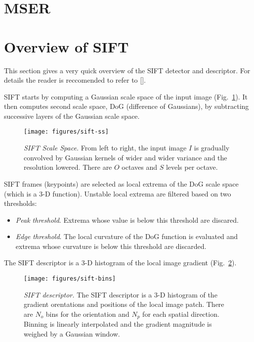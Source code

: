 \documentclass{article}
\begin{document}
\section{MSER}\label{mser}


\appendix
\section{Overview of SIFT}\label{sift.overview}

This section gives a very quick overview of the SIFT detector and
descriptor. For details the reader is reccomended to refer to [].

 SIFT starts by computing a
Gaussian scale space of the input image (Fig.~\ref{fig:sift-ss}). It
then computes second scale space, DoG (difference of Gaussians), by
subtracting successive layers of the Gaussian scale space.

\begin{figure}
\begin{center}
\texttt{[image: figures/sift-ss]}
\end{center}
\caption{{\em SIFT Scale Space.} From left to right, the input image
  $I$ is gradually convolved by Gaussian kernels of wider and wider
  variance and the resolution lowered. There are $O$ octaves and $S$
  levels per octave.}\label{fig:sift-ss}
\end{figure}

 SIFT frames (keypoints) are selected as
local extrema of the DoG scale space (which is a 3-D
function). Unstable local extrema are filtered based on two
thresholds:
\begin{itemize}
\item {\em Peak threshold}. Extrema whose value is below this
  threshold are discared.
\item {\em Edge threshold}. The local curvature of the DoG function is
  evaluated and extrema whose curvature is below this threshold are
  discarded.
\end{itemize}

 The SIFT descriptor is a 3-D histogram of
the local image gradient (Fig.~\ref{fig:sift-bins}).

\begin{figure}
\begin{center}
\texttt{[image: figures/sift-bins]}
\end{center}
\caption{{\em SIFT descriptor.} The SIFT descriptor is a 3-D histogram
  of the gradient orentations and positions of the local image
  patch. There are $N_o$ bins for the orientation and $N_p$ for each
  spatial direction. Binning is linearly interpolated and the gradient
  magnitude is weighed by a Gaussian window.}\label{fig:sift-bins}
\end{figure}

\end{document}
